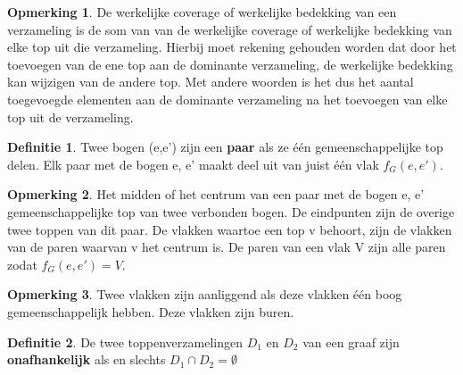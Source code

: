\documentclass[11pt, a4paper, table]{article}
\theoremstyle{definition}
\theoremstyle{definition}
\newtheorem{definitie}{Definitie}
\theoremstyle{definition}
\newtheorem{opmerking}{Opmerking}
\begin{document}
\begin{opmerking}
	De werkelijke coverage of werkelijke bedekking van een verzameling is de
	som van van de werkelijke coverage of werkelijke bedekking van elke top uit die verzameling. Hierbij moet rekening gehouden worden dat door het toevoegen van de ene top aan de dominante verzameling, de werkelijke bedekking kan wijzigen van de andere top. Met andere woorden is het dus het aantal toegevoegde elementen aan de dominante verzameling na het toevoegen van elke top uit de verzameling. 
\end{opmerking}
\begin{definitie}
	Twee bogen (e,e') zijn een \textbf{paar} als ze \'{e}\'{e}n gemeenschappelijke top delen. Elk paar met de bogen e, e' maakt deel uit van juist \'{e}\'{e}n vlak $f_G(e,e')$. 
\end{definitie}
\begin{opmerking}
	Het midden of het centrum van een paar met de bogen e, e'  gemeenschappelijke top van twee verbonden bogen. De eindpunten zijn de overige twee toppen van dit paar. De vlakken waartoe een top v behoort, zijn de vlakken van de paren waarvan v het centrum is. De paren van een vlak V zijn alle paren zodat $f_G(e,e')=V$.
\end{opmerking}
\begin{opmerking}
	Twee vlakken zijn aanliggend als deze vlakken \'{e}\'{e}n boog gemeenschappelijk hebben. Deze vlakken zijn buren. 
\end{opmerking}
\begin{definitie}
	De twee toppenverzamelingen $D_1$ en $D_2$ van een graaf zijn \textbf{onafhankelijk} als en slechts $D_1 \cap D_2 = \emptyset$
\end{definitie}
\end{document}
